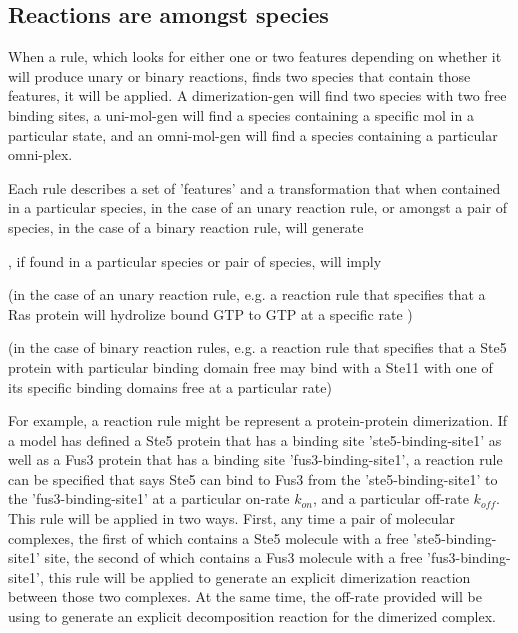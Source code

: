 \subsection{Reactions are amongst species}

When a rule, which looks for either one or two features depending on
whether it will produce unary or binary reactions, finds two species
that contain those features, it will be applied.  A dimerization-gen
will find two species with two free binding sites, a uni-mol-gen will
find a species containing a specific mol in a particular state, and an
omni-mol-gen will find a species containing a particular omni-plex.  





Each rule describes a set of 'features' and a transformation that when
contained in a particular species, in the case of an unary reaction
rule, or amongst a pair of species, in the case of a binary reaction
rule, will generate

   

, if found in a particular
species or pair of species, will
imply 

(in the case of an unary reaction rule, e.g. a reaction rule that
specifies that a Ras protein will hydrolize bound GTP to GTP at a 
specific rate ) 

(in the case of binary
reaction rules, e.g. a reaction rule that specifies that a Ste5
protein with particular binding domain free may bind with a Ste11 with
one of its specific binding domains free at a particular rate)


For example, a reaction rule might be represent a protein-protein
dimerization.  If a model has defined a Ste5 protein that has a
binding site 'ste5-binding-site1' as well as a Fus3 protein that has a
binding site 'fus3-binding-site1', a reaction rule can be specified
that says Ste5 can bind to Fus3 from the 'ste5-binding-site1' to the
'fus3-binding-site1' at a particular on-rate $k_{on}$, and a particular
off-rate $k_{off}$.  This rule will be applied in two ways.  First,
any time a pair of molecular complexes, the first of which contains a
Ste5 molecule with a free 'ste5-binding-site1' site, the second of which
contains a Fus3 molecule with a free 'fus3-binding-site1', this rule
will be applied to generate an explicit dimerization reaction between
those two complexes.  At the same time, the off-rate provided will be
using to generate an explicit decomposition reaction for the dimerized
complex.  

